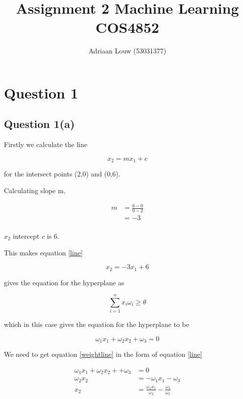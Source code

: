\documentclass[10pt,a4paper]{article}
\title{Assignment 2 Machine Learning COS4852}
\author{ Adriaan Louw (53031377) }
\begin{document}
\maketitle

\tableofcontents

\section{Question 1}
\subsection{Question 1(a)}

Firstly we calculate the line 

\begin{equation}
\label{line}
 x_2 = mx_1 + c
\end{equation}

for the intersect points (2,0) and (0,6).

Calculating slope m,

\begin{equation}
\begin{split}
m &= \frac{6-0}{0-2} \\
  &= -3\\
\end{split}
\end{equation}

$x_2$ intercept $c$ is 6.

This makes equation \ref{line}

\begin{equation}
\label{pop}
x_2 = -3x_1 + 6
\end{equation}

\cite{nils} gives the equation for the hyperplane as

\begin{equation}
\sum_{i=1}^n x_i\omega_i \geq \theta
\end{equation}

which in this case gives the equation for the hyperplane to be

\begin{equation}
\label{weightline}
\omega_1x_1 + \omega_2x_2 +\omega_3 = 0
\end{equation}

We need to get equation \ref{weightline} in the form of equation \ref{line}

\begin{equation}
\begin{split}
\label{simp}
\omega_1x_1 + \omega_2x_2 + +\omega_3 &= 0\\
\omega_2x_2 &= -\omega_1x_1 - \omega_3\\ 
x_2 &= \frac{\omega_1x_1}{\omega_2} - \frac{\omega_3}{\omega_2} \\ 
\end{split}
\end{equation}
\end{document}
